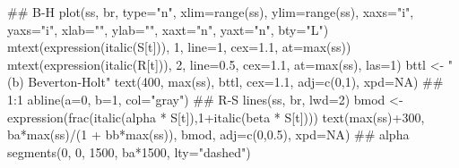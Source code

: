 \documentclass[11pt,]{article}
\newenvironment{Shaded}{}{}
\newcommand{\CommentTok}[1]{\textcolor[rgb]{0.00,0.50,0.00}{#1}}
\newcommand{\DataTypeTok}[1]{#1}
\newcommand{\DecValTok}[1]{#1}
\newcommand{\FloatTok}[1]{#1}
\newcommand{\KeywordTok}[1]{\textcolor[rgb]{0.00,0.00,1.00}{#1}}
\newcommand{\NormalTok}[1]{#1}
\newcommand{\OperatorTok}[1]{#1}
\newcommand{\OtherTok}[1]{\textcolor[rgb]{1.00,0.25,0.00}{#1}}
\newcommand{\StringTok}[1]{\textcolor[rgb]{0.00,0.50,0.50}{#1}}
\begin{document}
\begin{Shaded}
\begin{Highlighting}[]
\CommentTok{## B-H}
\KeywordTok{plot}\NormalTok{(ss, br, }\DataTypeTok{type=}\StringTok{"n"}\NormalTok{, }\DataTypeTok{xlim=}\KeywordTok{range}\NormalTok{(ss), }\DataTypeTok{ylim=}\KeywordTok{range}\NormalTok{(ss), }\DataTypeTok{xaxs=}\StringTok{"i"}\NormalTok{, }\DataTypeTok{yaxs=}\StringTok{"i"}\NormalTok{,}
     \DataTypeTok{xlab=}\StringTok{""}\NormalTok{, }\DataTypeTok{ylab=}\StringTok{""}\NormalTok{, }\DataTypeTok{xaxt=}\StringTok{"n"}\NormalTok{, }\DataTypeTok{yaxt=}\StringTok{"n"}\NormalTok{, }\DataTypeTok{bty=}\StringTok{"L"}\NormalTok{)}
\KeywordTok{mtext}\NormalTok{(}\KeywordTok{expression}\NormalTok{(}\KeywordTok{italic}\NormalTok{(S[t])), }\DecValTok{1}\NormalTok{, }\DataTypeTok{line=}\DecValTok{1}\NormalTok{, }\DataTypeTok{cex=}\FloatTok{1.1}\NormalTok{, }\DataTypeTok{at=}\KeywordTok{max}\NormalTok{(ss))}
\KeywordTok{mtext}\NormalTok{(}\KeywordTok{expression}\NormalTok{(}\KeywordTok{italic}\NormalTok{(R[t])), }\DecValTok{2}\NormalTok{, }\DataTypeTok{line=}\FloatTok{0.5}\NormalTok{, }\DataTypeTok{cex=}\FloatTok{1.1}\NormalTok{, }\DataTypeTok{at=}\KeywordTok{max}\NormalTok{(ss), }\DataTypeTok{las=}\DecValTok{1}\NormalTok{)}
\NormalTok{bttl <-}\StringTok{ "(b) Beverton-Holt"}
\KeywordTok{text}\NormalTok{(}\DecValTok{400}\NormalTok{, }\KeywordTok{max}\NormalTok{(ss), bttl, }\DataTypeTok{cex=}\FloatTok{1.1}\NormalTok{, }\DataTypeTok{adj=}\KeywordTok{c}\NormalTok{(}\DecValTok{0}\NormalTok{,}\DecValTok{1}\NormalTok{), }\DataTypeTok{xpd=}\OtherTok{NA}\NormalTok{)}
\CommentTok{## 1:1}
\KeywordTok{abline}\NormalTok{(}\DataTypeTok{a=}\DecValTok{0}\NormalTok{, }\DataTypeTok{b=}\DecValTok{1}\NormalTok{, }\DataTypeTok{col=}\StringTok{"gray"}\NormalTok{)}
\CommentTok{## R-S}
\KeywordTok{lines}\NormalTok{(ss, br, }\DataTypeTok{lwd=}\DecValTok{2}\NormalTok{)}
\NormalTok{bmod <-}\StringTok{ }\KeywordTok{expression}\NormalTok{(}\KeywordTok{frac}\NormalTok{(}\KeywordTok{italic}\NormalTok{(alpha }\OperatorTok{*}\StringTok{ }\NormalTok{S[t]),}\DecValTok{1}\OperatorTok{+}\KeywordTok{italic}\NormalTok{(beta }\OperatorTok{*}\StringTok{ }\NormalTok{S[t])))}
\KeywordTok{text}\NormalTok{(}\KeywordTok{max}\NormalTok{(ss)}\OperatorTok{+}\DecValTok{300}\NormalTok{, ba}\OperatorTok{*}\KeywordTok{max}\NormalTok{(ss)}\OperatorTok{/}\NormalTok{(}\DecValTok{1} \OperatorTok{+}\StringTok{ }\NormalTok{bb}\OperatorTok{*}\KeywordTok{max}\NormalTok{(ss)), bmod, }\DataTypeTok{adj=}\KeywordTok{c}\NormalTok{(}\DecValTok{0}\NormalTok{,}\FloatTok{0.5}\NormalTok{), }\DataTypeTok{xpd=}\OtherTok{NA}\NormalTok{)}
\CommentTok{## alpha}
\KeywordTok{segments}\NormalTok{(}\DecValTok{0}\NormalTok{, }\DecValTok{0}\NormalTok{, }\DecValTok{1500}\NormalTok{, ba}\OperatorTok{*}\DecValTok{1500}\NormalTok{, }\DataTypeTok{lty=}\StringTok{"dashed"}\NormalTok{)}

\end{Highlighting}
\end{Shaded}
\end{document}
